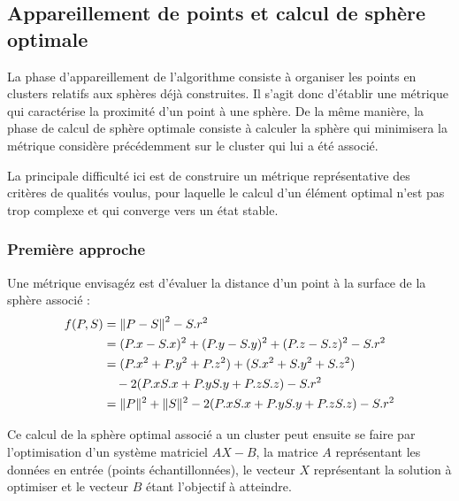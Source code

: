 \documentclass[10pt,a4paper,twoside, twocolumn]{report}
\begin{document}
\subsection{Appareillement de points et calcul de sphère optimale}

La phase d'appareillement de l'algorithme consiste à organiser les points en clusters relatifs aux sphères déjà construites. Il s’agit donc d’établir une métrique qui caractérise la proximité d'un point à une sphère. De la même manière, la phase de calcul de sphère optimale consiste à calculer la sphère qui minimisera la métrique considère précédemment sur le cluster qui lui a été associé.

La principale difficulté ici est de construire un métrique représentative des critères de qualités voulus, pour laquelle le calcul d'un élément optimal n'est pas trop complexe et qui converge vers un état stable.

\subsubsection{Première approche}

Une métrique envisagéz est d'évaluer la distance d'un point à la surface de la sphère associé :
\begin{align}
	f(P, S) &= \left\|P-S\right\|^2 - S.r^2															\label{eq:metrique}	\\
					&= (P.x-S.x)^2 + (P.y-S.y)^2 + (P.z-S.z)^2 - S.r^2					\notag \\
					&= (P.x^2 + P.y^2+P.z^2) + (S.x^2+S.y^2+S.z^2)							\notag \\
					&\quad - 2(P.xS.x + P.yS.y + P.zS.z)  - S.r^2								\notag \\
					&= \|P\|^2 + \|S\|^2 - 2(P.xS.x + P.yS.y + P.zS.z) - S.r^2	\notag
\end{align}

Ce calcul de la sphère optimal associé a un cluster peut ensuite se faire par l'optimisation d'un système matriciel $AX-B$, la matrice $A$ représentant les données en entrée (points échantillonnées), le vecteur $X$ représentant la solution à optimiser et le vecteur $B$ étant l'objectif à atteindre.
\end{document}
